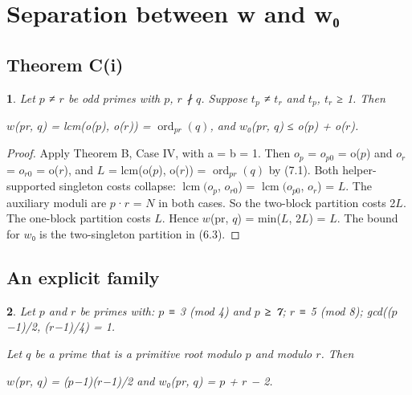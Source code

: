 \documentclass[pdflatex,sn-mathphys-num]{sn-jnl}
\theoremstyle{thmstyleone}
\newcommand{\thmxname}{}
\newtheorem*{thmxinner}{\thmxname}
\newenvironment{thmx}[1]{\renewcommand{\thmxname}{#1}\begin{thmxinner}}{\end{thmxinner}}
\theoremstyle{thmstylethree}
\begin{document}
\section{Separation between w and w₀}

\subsection{Theorem C(i)}

\begin{thmx}{Theorem C (i)}

Let \(p\) ≠ \(r\) be odd primes with \(p\), \(r\) ∤ \(q\). Suppose \(t_p\) ≠ \(t_r\) and \(t_p\), \(t_r\) ≥ 1. Then

\begin{center}\(w\)(pr, \(q\)) = lcm(o(\(p\)), o(\(r\))) = \(\operatorname{ord}_{pr}(q)\), and \(w\)₀(pr, \(q\)) ≤ o(\(p\)) + o(\(r\)).\end{center}

\end{thmx}

\begin{proof}[Proof]

Apply Theorem B, Case IV, with a = b = 1. Then \(o_p\) = \(o_{p0}\) = o(\(p\)) and \(o_r\) = \(o_{r0}\) = o(\(r\)), and \(L\) = lcm(o(\(p\)), o(\(r\))) = \(\operatorname{ord}_{pr}(q)\) by (7.1). Both helper-supported singleton costs collapse: \(\operatorname{lcm}(o_p\), \(o_{r0}\)) = \(\operatorname{lcm}(o_{p0}\), \(o_r\)) = \(L\). The auxiliary moduli are \(p\)·\(r\) = \(N\) in both cases. So the two-block partition costs 2\(L\). The one-block partition costs \(L\). Hence \(w\)(pr, \(q\)) = min(\(L\), 2\(L\)) = \(L\). The bound for \(w\)₀ is the two-singleton partition in (6.3).

\end{proof}

\subsection{An explicit family}

\begin{thmx}{Theorem C (ii), first part}

Let \(p\) and \(r\) be primes with: \(p\) ≡ 3 (mod 4) and \textbf{\(p\) ≥ 7}; \(r\) ≡ 5 (mod 8); gcd((\(p\)−1)/2, (\(r\)−1)/4) = 1.

Let \(q\) be a prime that is a primitive root modulo \(p\) and modulo \(r\). Then

\begin{center}\(w\)(pr, \(q\)) = (\(p\)−1)(\(r\)−1)/2 and \(w\)₀(pr, \(q\)) = \(p\) + \(r\) − 2.\end{center}

\end{thmx}
\end{document}
